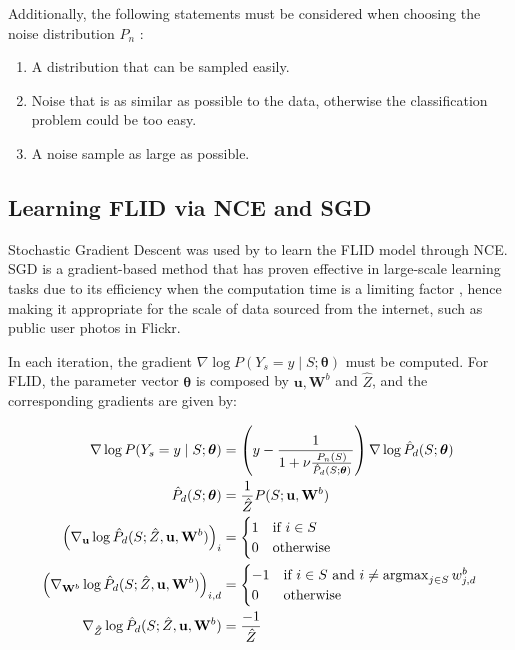 Additionally, the following statements must be considered when choosing the noise distribution $P_{n}$ \citep{Gutmann12NCE}:

\begin{enumerate}
  \item A distribution that can be sampled easily.
  \item Noise that is as similar as possible to the data, otherwise the classification problem could be too easy.
  \item A noise sample as large as possible.
\end{enumerate}

\subsection{Learning FLID via NCE and SGD}

Stochastic Gradient Descent was used by \citet{tschiatschek16learning} to learn the FLID model through NCE. SGD is a gradient-based method that has proven effective in large-scale learning tasks due to its efficiency when the computation time is a limiting factor \citep{Bottou2010, Zhang2004}, hence making it appropriate for the scale of data sourced from the internet, such as public user photos in Flickr.

In each iteration, the gradient $\nabla \log{P(Y_{s} = y \mid S;\boldsymbol{\theta})}$ must be computed. For FLID, the parameter vector $\boldsymbol{\theta}$ is composed by $\mathbf{u}, \mathbf{W}^{b}$ and $\hat{Z}$, and the corresponding gradients are given by:

\begin{align}
  \label{eq:gradient-flid-1}
  \nabla \log{P(Y_{s} = y \mid S;\boldsymbol{\theta})} &= \left(y - \frac{1}{1 + \nu \frac{P_{n}(S)}{\hat{P}_{d}(S;\boldsymbol{\theta})}}\right) \nabla \log{\hat{P}_{d}(S;\boldsymbol{\theta})} \\
  \label{eq:gradient-flid-2}
  \hat{P}_{d}(S;\boldsymbol{\theta}) &= \frac{1}{\hat{Z}}P(S; \mathbf{u}, \mathbf{W}^{b}) \\
  \left(\nabla_{\mathbf{u}}\log{\hat{P}_{d}(S; \hat{Z}, \mathbf{u}, \mathbf{W}^{b})}\right)_{i} &= \begin{cases}
    1 &  \text{if}\ i \in S \\
    0 & \text{otherwise}
  \end{cases} \\
  \label{eq:gradient-flid-3}
  \left(\nabla_{\mathbf{W}^{b}}\log{\hat{P}_{d}(S; \hat{Z}, \mathbf{u}, \mathbf{W}^{b})}\right)_{i,d} &= \begin{cases}
    -1 & \text{if}\ i \in S\ \text{and}\ i \neq \operatorname*{argmax}_{j \in S}{w^{b}_{j,d}} \\
    0 & \text{otherwise}
  \end{cases} \\
  \label{eq:gradient-flid-4}
  \nabla_{\hat{Z}}\log{\hat{P}_{d}(S; \hat{Z}, \mathbf{u}, \mathbf{W}^{b})}&= \frac{-1}{\hat{Z}}
\end{align}

